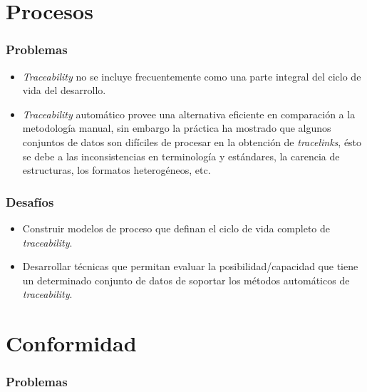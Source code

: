 \documentclass[a4paper,12pt,oneside,spanish]{book}
\begin{document}
\section{Procesos}

\subsubsection{Problemas}

\begin{itemize}[label={$\times$}]

\item \textit{Traceability} no se incluye frecuentemente como una parte integral del ciclo de vida del desarrollo.

\item \textit{Traceability} automático provee una alternativa eficiente en comparación a la metodología manual, sin embargo la práctica ha mostrado que algunos conjuntos de datos  son difíciles de procesar en la obtención de \textit{tracelinks}, ésto se debe a las inconsistencias en terminología y estándares, la carencia de estructuras, los formatos heterogéneos, etc.

\end{itemize}

\subsubsection{Desafíos}

\begin{itemize}[label={\checkmark}]

\item Construir modelos de proceso que definan el ciclo de vida completo de \textit{traceability}.

\item Desarrollar técnicas que permitan evaluar la posibilidad/capacidad que tiene un determinado conjunto de datos de soportar los métodos automáticos de \textit{traceability}.
 
\end{itemize}

\section{Conformidad}

\subsubsection{Problemas}
\end{document}
